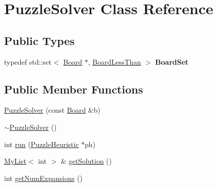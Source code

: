 \hypertarget{classPuzzleSolver}{\section{\-Puzzle\-Solver \-Class \-Reference}
\label{classPuzzleSolver}
}
\subsection*{\-Public \-Types}
\begin{DoxyCompactItemize}
\item 
\hypertarget{classPuzzleSolver_aa48b4706b55ceb5077a859794bc12ed7}{typedef std\-::set$<$ \hyperlink{classBoard}{\-Board} \*
$\ast$, \hyperlink{structBoardLessThan}{\-Board\-Less\-Than} $>$ {\bfseries \-Board\-Set}}\label{classPuzzleSolver_aa48b4706b55ceb5077a859794bc12ed7}

\end{DoxyCompactItemize}
\subsection*{\-Public \-Member \-Functions}
\begin{DoxyCompactItemize}
\item 
\hyperlink{classPuzzleSolver_a70e86dbac90a3c6567598cb02fc523f2}{\-Puzzle\-Solver} (const \hyperlink{classBoard}{\-Board} \&b)
\item 
\hyperlink{classPuzzleSolver_adcc789feca768f7d468f6ca8806f75a3}{$\sim$\-Puzzle\-Solver} ()
\item 
int \hyperlink{classPuzzleSolver_a99e867d21204e8958f0bdfbcbbd01c5f}{run} (\hyperlink{classPuzzleHeuristic}{\-Puzzle\-Heuristic} $\ast$ph)
\item 
\hyperlink{classMyList}{\-My\-List}$<$ int $>$ \& \hyperlink{classPuzzleSolver_af33dd521433789d5dbd9476144f53928}{get\-Solution} ()
\item 
int \hyperlink{classPuzzleSolver_a2aa96aa4631d4a4b295fddf49e5dd9f7}{get\-Num\-Expansions} ()
\end{DoxyCompactItemize}


